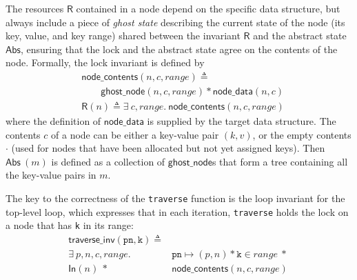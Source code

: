 \documentclass[sigplan,screen]{acmart}
\newcommand{\treerep}{\ensuremath{\mathsf{Abs}}}
\newcommand{\inFP}{\ensuremath{\mathsf{In }}}
\begin{document}
{The resources $\mathsf{R}$ contained in a node depend on the specific data structure, but always include a piece of \emph{ghost state} describing the current state of the node (its key, value, and key range) shared between the invariant $\mathsf{R}$ and the abstract state $\treerep$, ensuring that the lock and the abstract state agree on the contents of the node. Formally, the lock invariant is defined by 
\begin{align*}&\mathsf{node\_contents}(n, c, \mathit{range}) \triangleq \\ 
	&\qquad\mathsf{ghost\_node}(n, c,\mathit{range}) \ast \mathsf{node\_data}(n, c) \\
	&\mathsf{R}(n) \triangleq \exists\ c, \mathit{range}.\ \mathsf{node\_contents}(n, c, \mathit{range})
\end{align*}
where the definition of $\mathsf{node\_data}$ is supplied by the target data structure. The contents $c$ of a node can be either a key-value pair $(k, v)$, or the empty contents $\cdot$ (used for nodes that have been allocated but not yet assigned keys). Then $\treerep\ (m)$ is defined as a collection of $\mathsf{ghost\_node}$s that form a tree containing all the key-value pairs in $m$.



The key to the correctness of the \texttt{traverse} function is the loop invariant for the top-level loop, which expresses that in each iteration, \lstinline{traverse} holds the lock on a node that has \lstinline{k} in its range:
\begin{align*}\mathsf{traverse\_inv}(\texttt{pn}, \texttt{k}) \triangleq \\ \exists \ p, n, c, \mathit{range}.\ &\texttt{pn} \mapsto (p, n) \ast \texttt{k} \in \mathit{range}\ \ast \ \\  \inFP(n)  \ \ast \  &\mathsf{node\_contents}(n, c, \mathit{range})
\end{align*}

}
\end{document}
